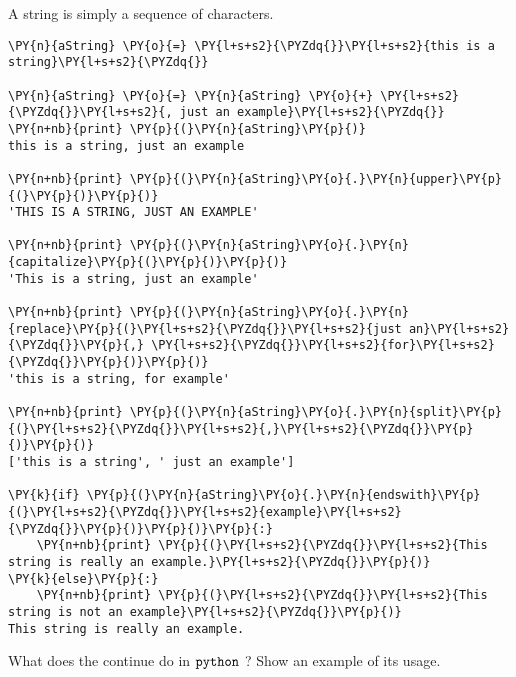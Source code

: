 \begin{Answer}
A string is simply a sequence of characters.

\begin{tcolorbox}[size=fbox, boxrule=1pt, colback=cellbackground, colframe=cellborder]
\begin{Verbatim}[commandchars=\\\{\}]
\PY{n}{aString} \PY{o}{=} \PY{l+s+s2}{\PYZdq{}}\PY{l+s+s2}{this is a string}\PY{l+s+s2}{\PYZdq{}}
  
\PY{n}{aString} \PY{o}{=} \PY{n}{aString} \PY{o}{+} \PY{l+s+s2}{\PYZdq{}}\PY{l+s+s2}{, just an example}\PY{l+s+s2}{\PYZdq{}}
\PY{n+nb}{print} \PY{p}{(}\PY{n}{aString}\PY{p}{)}
this is a string, just an example

\PY{n+nb}{print} \PY{p}{(}\PY{n}{aString}\PY{o}{.}\PY{n}{upper}\PY{p}{(}\PY{p}{)}\PY{p}{)}
'THIS IS A STRING, JUST AN EXAMPLE'

\PY{n+nb}{print} \PY{p}{(}\PY{n}{aString}\PY{o}{.}\PY{n}{capitalize}\PY{p}{(}\PY{p}{)}\PY{p}{)}
'This is a string, just an example'

\PY{n+nb}{print} \PY{p}{(}\PY{n}{aString}\PY{o}{.}\PY{n}{replace}\PY{p}{(}\PY{l+s+s2}{\PYZdq{}}\PY{l+s+s2}{just an}\PY{l+s+s2}{\PYZdq{}}\PY{p}{,} \PY{l+s+s2}{\PYZdq{}}\PY{l+s+s2}{for}\PY{l+s+s2}{\PYZdq{}}\PY{p}{)}\PY{p}{)}
'this is a string, for example'

\PY{n+nb}{print} \PY{p}{(}\PY{n}{aString}\PY{o}{.}\PY{n}{split}\PY{p}{(}\PY{l+s+s2}{\PYZdq{}}\PY{l+s+s2}{,}\PY{l+s+s2}{\PYZdq{}}\PY{p}{)}\PY{p}{)}
['this is a string', ' just an example']

\PY{k}{if} \PY{p}{(}\PY{n}{aString}\PY{o}{.}\PY{n}{endswith}\PY{p}{(}\PY{l+s+s2}{\PYZdq{}}\PY{l+s+s2}{example}\PY{l+s+s2}{\PYZdq{}}\PY{p}{)}\PY{p}{)}\PY{p}{:}
    \PY{n+nb}{print} \PY{p}{(}\PY{l+s+s2}{\PYZdq{}}\PY{l+s+s2}{This string is really an example.}\PY{l+s+s2}{\PYZdq{}}\PY{p}{)}
\PY{k}{else}\PY{p}{:}
    \PY{n+nb}{print} \PY{p}{(}\PY{l+s+s2}{\PYZdq{}}\PY{l+s+s2}{This string is not an example}\PY{l+s+s2}{\PYZdq{}}\PY{p}{)}
This string is really an example.
\end{Verbatim}
\end{tcolorbox}
\end{Answer}

\begin{Exercise}
What does the continue do in \(\tt{python}\) ? Show an example of its usage.
\end{Exercise}

